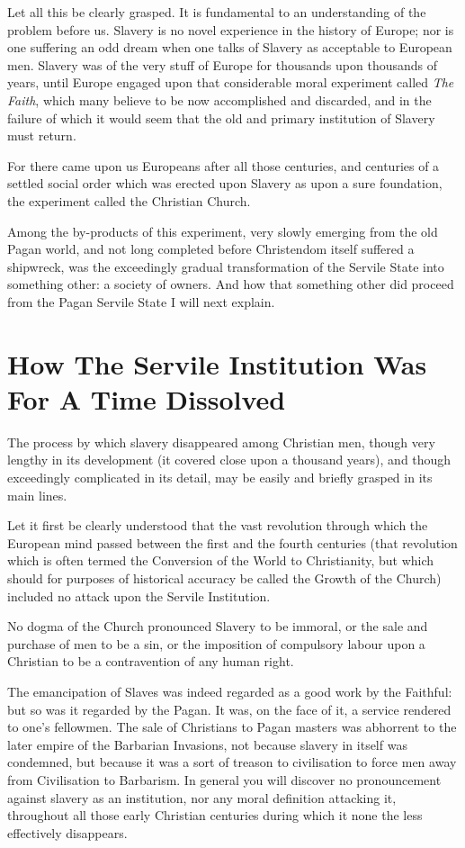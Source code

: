 \documentclass{book}
\begin{document}
Let all this be clearly grasped. It is fundamental to an understanding of the problem before us. Slavery is no novel experience in the history of Europe; nor is one suffering an odd dream when one talks of Slavery as acceptable to European men. Slavery was of the very stuff of Europe for thousands upon thousands of years, until Europe engaged upon that considerable moral experiment called \emph{The Faith}, which many believe to be now accomplished and discarded, and in the failure of which it would seem that the old and primary institution of Slavery must return.

For there came upon us Europeans after all those centuries, and centuries of a settled social order which was erected upon Slavery as upon a sure foundation, the experiment called the Christian Church.

Among the by-products of this experiment, very slowly emerging from the old Pagan world, and not long completed before Christendom itself suffered a shipwreck, was the exceedingly gradual transformation of the Servile State into something other: a society of owners. And how that something other did proceed from the Pagan Servile State I will next explain.

\chapter{How The Servile Institution Was For A Time Dissolved}
\label{chapter-3}
The process by which slavery disappeared among Christian men, though very lengthy in its development (it covered close upon a thousand years), and though exceedingly complicated in its detail, may be easily and briefly grasped in its main lines.

Let it first be clearly understood that the vast revolution through which the European mind passed between the first and the fourth centuries (that revolution which is often termed the Conversion of the World to Christianity, but which should for purposes of historical accuracy be called the Growth of the Church) included no attack upon the Servile Institution.

No dogma of the Church pronounced Slavery to be immoral, or the sale and purchase of men to be a sin, or the imposition of compulsory labour upon a Christian to be a contravention of any human right.

The emancipation of Slaves was indeed regarded as a good work by the Faithful: but so was it regarded by the Pagan. It was, on the face of it, a service rendered to one’s fellowmen. The sale of Christians to Pagan masters was abhorrent to the later empire of the Barbarian Invasions, not because slavery in itself was condemned, but because it was a sort of treason to civilisation to force men away from Civilisation to Barbarism. In general you will discover no pronouncement against slavery as an institution, nor any moral definition attacking it, throughout all those early Christian centuries during which it none the less effectively disappears.
\end{document}
